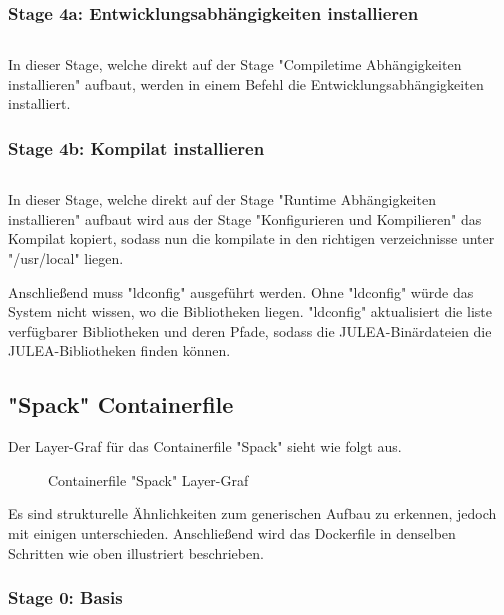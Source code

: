 \subsubsection{Stage 4a: Entwicklungsabhängigkeiten installieren}

\inputminted[firstline=61,lastline=65]{dockerfile}{./code-examples/Dockerfile.system}

In dieser Stage, welche direkt auf der Stage "Compiletime Abhängigkeiten installieren" aufbaut, werden in einem Befehl die Entwicklungsabhängigkeiten installiert.

\subsubsection{Stage 4b: Kompilat installieren}

\inputminted[firstline=55,lastline=58]{dockerfile}{./code-examples/Dockerfile.system}

In dieser Stage, welche direkt auf der Stage "Runtime Abhängigkeiten installieren" aufbaut wird aus der Stage "Konfigurieren und Kompilieren" das Kompilat kopiert, sodass nun die kompilate in den richtigen verzeichnisse unter "/usr/local" liegen.

Anschließend muss "ldconfig" ausgeführt werden. Ohne "ldconfig" würde das System nicht wissen, wo die Bibliotheken liegen. "ldconfig" aktualisiert die liste verfügbarer Bibliotheken und deren Pfade, sodass die JULEA-Binärdateien die JULEA-Bibliotheken finden können.

\subsection{"Spack" Containerfile}
Der Layer-Graf für das Containerfile "Spack" sieht wie folgt aus.
\begin{figure}[!htbp]
    \centering
    
    \caption{Containerfile "Spack" Layer-Graf}
\end{figure}

Es sind strukturelle Ähnlichkeiten zum generischen Aufbau zu erkennen, jedoch mit einigen unterschieden. Anschließend wird das Dockerfile in denselben Schritten wie oben illustriert beschrieben.

\subsubsection{Stage 0: Basis}

\inputminted[firstline=0,lastline=8]{dockerfile}{./code-examples/Dockerfile.spack}

